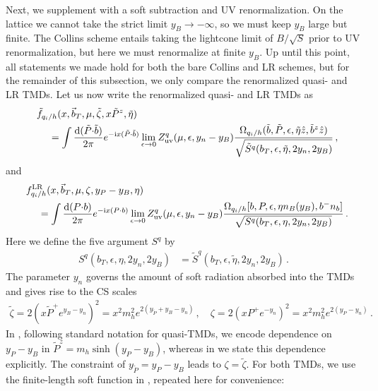 \documentclass[11pt,a4paper]{article}
\newcommand{\df}{\mathrm{d}}
\newcommand{\img}{\mathrm{i}}
\newcommand{\eps}{\epsilon}
\newcommand{\nn}{\nonumber}
\newcommand{\bt}{\vec b_T}
\newcommand{\Corr}{\Omega}
\newcommand{\q}{q_i}
\newcommand{\LR}{\mathrm{LR}}
\begin{document}
Next, we supplement  with a soft subtraction and UV renormalization.
On the lattice we cannot take the strict limit $y_B \to -\infty$, so we must keep $y_B$ large but finite.
The Collins scheme entails taking the lightcone limit of $B/\sqrt{S}$ prior to UV renormalization,
but here we must renormalize at finite $y_B$.
Up until this point, all statements we made hold for both the bare Collins and LR schemes, 
but for the remainder of this subsection, we only compare the renormalized quasi- and LR TMDs. 
Let us now write the renormalized quasi- and LR TMDs as
\begin{align} \label{eq:def_qTMD}
 &\phantom{=} \tilde f_{\q/h}(x, \bt, \mu, \tilde\zeta, x \tilde P^z, \tilde\eta)
 \nn\\&
 \qquad= \int\frac{\df (\tilde P{\cdot}\tilde b)}{2\pi} e^{-\img x (\tilde P{\cdot}\tilde b)}
   \lim_{\eps\to0} Z_{\rm uv}^q(\mu, \eps, y_n - y_B)
   \frac{\Corr_{\q/h}(\tilde b, \tilde P, \eps, \tilde\eta \hat z, \tilde b^z \hat z)}
        {\sqrt{\tilde S^q(b_T, \eps, \tilde\eta, 2y_n, 2y_B)}}
\,,
\end{align}
and
\begin{align} \label{eq:def_LR}
 &\phantom{=} f^\LR_{\q/h}(x, \bt, \mu, \zeta, y_P - y_B, \eta)
 \nn\\&
 \qquad= \int\frac{\df (P{\cdot}b)}{2\pi} e^{-\img x (P{\cdot}b)}
   \lim_{\eps\to0} Z_{\rm uv}^q(\mu, \eps, y_n - y_B)
   \frac{\Corr_{\q/h}[ b, P, \eps,  \eta n_B(y_B), b^- n_b ]}
        {\sqrt{ S^q(b_T, \eps, \eta, 2y_n, 2y_B)}}
\,.\end{align}
Here we define the five argument $S^q$ by
\begin{align}
 S^q(b_T, \eps, \eta , 2y_n, 2y_B) &=
    \tilde S^q(b_T, \eps, \tilde\eta, 2y_n, 2y_B) \,.
\end{align}
The parameter $y_n$ governs the amount of soft radiation absorbed into the TMDs
and gives rise to the CS scales
\begin{align}
 \tilde\zeta = 2 (x \tilde P^+ e^{y_B-y_n})^2 = x^2 m_h^2 e^{2( y_{\tilde P} + y_B- y_n)}
\,,\quad
 \zeta = 2 (x P^+ e^{-y_n})^2 = x^2 m_h^2 e^{2(y_P - y_n)}
\,.\end{align}
In , following standard notation for quasi-TMDs,
we encode dependence on $y_P-y_B$ in $\tilde P^z = m_h \sinh(y_P - y_B)$,
whereas in  we state this dependence explicitly. The constraint of $ y_{\tilde P}=y_P-y_B$ leads to $\zeta=\tilde \zeta$.
For both TMDs, we use the finite-length soft function in , repeated here for convenience:
\end{document}
